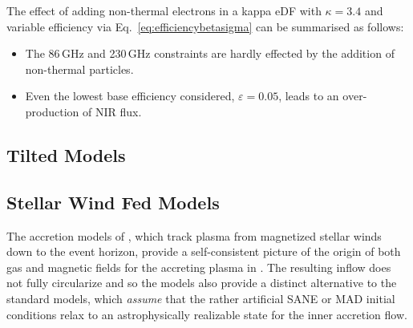 The effect of adding non-thermal electrons in a kappa eDF with  $\kappa=3.4$ and variable efficiency via Eq.~\ref{eq:efficiencybetasigma} can be summarised as follows:
\begin{itemize}
    \item The 86\,GHz and 230\,GHz constraints are hardly effected by the addition of non-thermal particles.
    \item Even the lowest base efficiency considered, $\varepsilon=0.05$, leads to an over-production of NIR flux. 
\end{itemize}




\subsection{Tilted Models}


\subsection{Stellar Wind Fed Models}

The accretion models of \cite{2020ApJ...896L...6R, 2020MNRAS.492.3272R, 2018MNRAS.478.3544R}, which track plasma from  magnetized stellar winds down to the event horizon, provide a self-consistent picture of the origin of both gas and magnetic fields for the accreting plasma in \sgra.  The resulting inflow does not fully circularize and so the models also provide a distinct alternative to the standard models, which {\em assume} that the rather artificial SANE or MAD initial conditions relax to an astrophysically realizable state for the inner accretion flow.   

